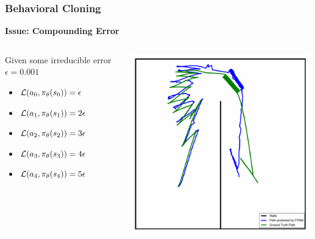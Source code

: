 \begin{frame}
	\frametitle{Behavioral Cloning}
		\textbf{Issue: Compounding Error}
		\begin{columns}
			\begin{column}{0.5\textwidth}
			Given some irreducible error $\epsilon =0.001$
				\begin{itemize}
					\item ${\mathcal L}(a_0, \pi_\theta(s_0)) = \epsilon$
					\item ${\mathcal L}(a_1, \pi_\theta(s_1)) = 2\epsilon$
					\item ${\mathcal L}(a_2, \pi_\theta(s_2)) = 3\epsilon$
					\item ${\mathcal L}(a_3, \pi_\theta(s_3)) = 4\epsilon$
					\item ${\mathcal L}(a_4, \pi_\theta(s_4)) = 5\epsilon$
				\end{itemize}
			\end{column}
			\begin{column}{0.5\textwidth}
				\includegraphics[width=0.99\textwidth]{bh1.png}
			\end{column}
		\end{columns}
\end{frame}

